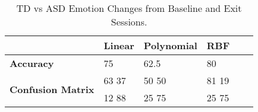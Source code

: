 \begin{table*}[tbp]
	\label{tab4}
	
	\begin{center}
	\caption{TD vs ASD Emotion Changes from Baseline and Exit Sessions.}
	\vspace{3mm}
		\begin{tabular}{llllll}
			& \textbf{Linear} & \textbf{Polynomial} & \textbf{RBF} \\
			\hline
			
			\textbf{Accuracy}                          & 75              & 62.5                & 80           \\
			\hline
			\multirow{2}{*}{\textbf{Confusion Matrix}} & 63  37          & 50  50              & 81  19       \\
			& 12  88          & 25  75              & 25  75       \\
			\hline
		\end{tabular}
		\label{tab4}
	\end{center}
\end{table*}

